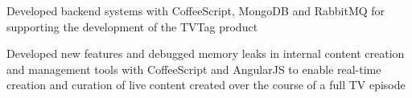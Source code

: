 \begin{job}

  \begin{accomplishments}
    \item Developed backend systems with CoffeeScript, MongoDB and RabbitMQ for
    supporting the development of the TVTag product
    \item Developed new features and debugged memory leaks in internal content
    creation and management tools with CoffeeScript and AngularJS to enable
    real-time creation and curation of live content created over the course of a
    full TV episode
  \end{accomplishments}
\end{job}
